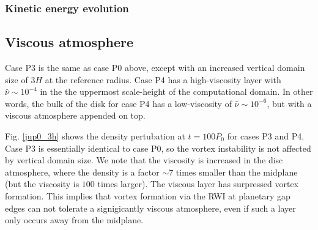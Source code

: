 \subsubsection{Kinetic energy evolution}




\subsection{Viscous atmosphere}
Case P3 is the same as case P0 above, except with an increased
vertical domain size of $3H$ at the reference radius. Case P4 has a high-viscosity layer with
$\hat{\nu}\sim10^{-4}$ in the the uppermost scale-height of the
computational domain. In other words, the bulk of the 
disk for case P4 has a low-viscosity of $\hat{\nu}\sim10^{-6}$, but
with a viscous atmosphere appended on top.  

Fig. \ref{jup0_3h} shows the density pertubation at $t=100P_0$ for
cases P3 and P4. Case P3 is essentially identical to case P0, so the 
vortex instability is not affected by vertical domain size. We note
that the viscosity is increased in the disc atmosphere, where the
density is a factor $\sim 7$ times smaller than the midplane (but the
viscosity is $100$ times larger). The viscous layer has surpressed
vortex formation. This implies that vortex formation via
the RWI at planetary gap edges can not tolerate a signigicantly
viscous atmosphere, even if such a layer only occurs away from the
midplane.    

